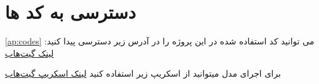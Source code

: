 
\section{دسترسی به کد ها}\ref{ap:codes}
می توانید کد استفاده شده در این پروژه را در آدرس زیر دسترسی پیدا کنید:
\href{https://github.com/soheilsalimidev/lo-fAi}{لینک گیت‌هاب}

برای اجرای مدل میتوانید از اسکریپ زیر استفاده کنید
\href{https://github.com/soheilsalimidev/lo-fAi/blob/main/packages/inference/inferRWKV.py}{لینک اسکریپ گیت‌هاب}